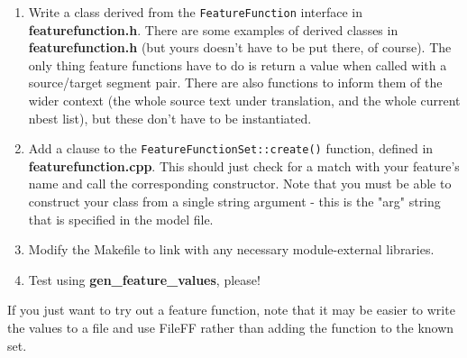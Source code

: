 \documentclass[12pt]{amsart}
\newcommand{\file}{\textbf} \newcommand{\url}{\underline}
\newcommand{\code}[1]{{\small \texttt{#1}}}
\begin{document}
\begin{enumerate}
  
\item Write a class derived from the \code{FeatureFunction} interface in
  \file{featurefunction.h}.  There are some examples of derived classes in
  \file{featurefunction.h} (but yours doesn't have to be put there, of course).
  The only thing feature functions have to do is return a value when called
  with a source/target segment pair.  There are also functions to inform them
  of the wider context (the whole source text under translation, and the whole
  current nbest list), but these don't have to be instantiated.
  
\item Add a clause to the \code{FeatureFunctionSet::create()} function, defined
  in \file{featurefunction.cpp}.  This should just check for a match with your
  feature's name and call the corresponding constructor.  Note that you must be
  able to construct your class from a single string argument - this is the
  "arg" string that is specified in the model file.

\item
  Modify the Makefile to link with any necessary module-external libraries.

\item
  Test using \textbf{gen\_feature\_values}, please!

\end{enumerate}

If you just want to try out a feature function, note that it may be easier to
write the values to a file and use FileFF rather than adding the function to
the known set.

 
\end{document}
